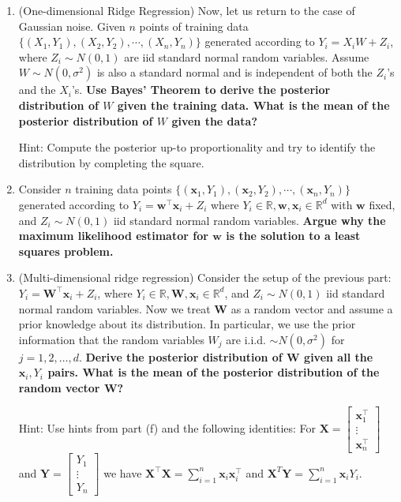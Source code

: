 \documentclass{article}\usepackage[utf8]{inputenc}\usepackage[margin=0.4cm,top=0.4cm,bottom=0.4cm]{geometry}\usepackage[usenames,dvipsnames,svgnames,table]{xcolor}
\begin{document}
\begin{enumerate}
\EndSolution
\item (One-dimensional Ridge Regression) Now, let us return to the case of Gaussian noise. Given $n$ points of training data $\{(X_1,Y_1),(X_2,Y_2),\cdots, (X_n,Y_n)\}$ generated according to $Y_i=X_i W+Z_i$, where $Z_i \sim N(0,1)$ are iid standard normal random variables. Assume $W \sim N(0,\sigma^2)$ is also a standard normal and is independent of both the $Z_i$'s and the $X_i$'s. {\bf Use Bayes' Theorem to derive the posterior distribution of $W$ given the training data. What is the mean of the posterior distribution of $W$ given the data?}
\vspace{4pt}

\noindent Hint: Compute the posterior up-to proportionality and try to identify the distribution by completing the square.
\BeginSolution

\EndSolution
\item Consider $n$ training data points $\{(\mathbf{x}_1,Y_1),(\mathbf{x}_2,Y_2),\cdots, (\mathbf{x}_n,Y_n)\}$ generated according to $Y_i=\mathbf w^\top \mathbf{x}_i+Z_i$ where $Y_i\in\mathbb{R}, \mathbf{w}, \mathbf{x}_i \in\mathbb{R}^d$ with $\mathbf w$ fixed, and $Z_i \sim N(0,1)$ iid standard normal random variables.  {\bf Argue why the maximum likelihood estimator for $\mathbf w$ is the solution to a least squares problem.} 
\BeginSolution

\EndSolution
\item (Multi-dimensional ridge regression) Consider the setup of the previous part: $Y_i= \mathbf{W}^\top \mathbf{x}_i+Z_i$, where $Y_i\in\mathbb{R}, \mathbf{W}, \mathbf{x}_i \in\mathbb{R}^d$, and $Z_i \sim N(0,1)$ iid standard normal random variables. Now we treat $\mathbf{W}$ as a random vector and assume a prior knowledge about its distribution. In particular, we use the prior information that the random variables $W_j$ are i.i.d. $\sim N(0,\sigma^2)$ for $j=1,2,\ldots,d$. {\bf Derive the posterior distribution of $\mathbf{W}$ given all the $\mathbf{x}_i,Y_i$ pairs. What is the mean of the posterior distribution of the random vector $\mathbf{W}$?} 
\vspace{4pt}

\noindent Hint: Use hints from part (f) and the following identities: For $\mathbf{X} = \begin{bmatrix}  \mathbf {x}_1^\top  \\ \vdots \\ \mathbf{x}_n^\top \end{bmatrix} $ and $\mathbf{Y} = \begin{bmatrix}  Y_1 \\ \vdots \\ Y_n \end{bmatrix}$ we have $\mathbf{X}^\top \mathbf{X} = \sum_{i=1}^n \mathbf{x}_i\mathbf{x}_i^\top $ and $\mathbf{X}^T \mathbf{Y} = \sum_{i=1}^n \mathbf{x}_i Y_i$.
\BeginSolution


\end{enumerate}
\end{document}
